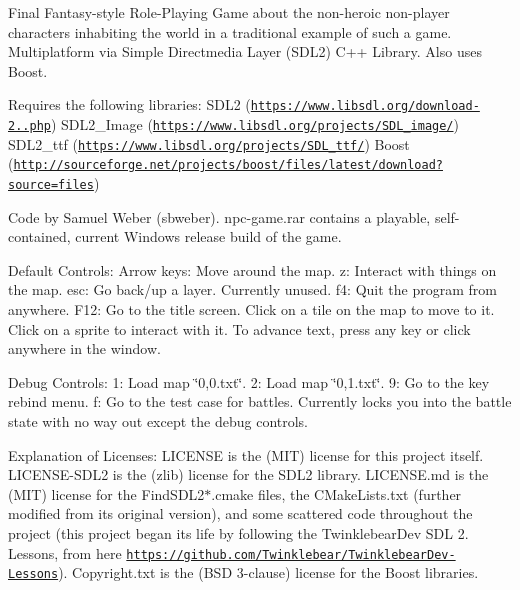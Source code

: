 Final Fantasy-\/style Role-\/\+Playing Game about the non-\/heroic non-\/player characters inhabiting the world in a traditional example of such a game. Multiplatform via Simple Directmedia Layer (S\+D\+L2) C++ Library. Also uses Boost.

Requires the following libraries\+: S\+D\+L2 (\href{https://www.libsdl.org/download-2.0.php}{\tt https\+://www.\+libsdl.\+org/download-\/2..\+php}) S\+D\+L2\+\_\+\+Image (\href{https://www.libsdl.org/projects/SDL_image/}{\tt https\+://www.\+libsdl.\+org/projects/\+S\+D\+L\+\_\+image/}) S\+D\+L2\+\_\+ttf (\href{https://www.libsdl.org/projects/SDL_ttf/}{\tt https\+://www.\+libsdl.\+org/projects/\+S\+D\+L\+\_\+ttf/}) Boost (\href{http://sourceforge.net/projects/boost/files/latest/download?source=files}{\tt http\+://sourceforge.\+net/projects/boost/files/latest/download?source=files})

Code by Samuel Weber (sbweber). npc-\/game.\+rar contains a playable, self-\/contained, current Windows release build of the game.

Default Controls\+: Arrow keys\+: Move around the map. z\+: Interact with things on the map. esc\+: Go back/up a layer. Currently unused. f4\+: Quit the program from anywhere. F12\+: Go to the title screen. Click on a tile on the map to move to it. Click on a sprite to interact with it. To advance text, press any key or click anywhere in the window.

Debug Controls\+: 1\+: Load map \char`\"{}0,0.\+txt\char`\"{}. 2\+: Load map \char`\"{}0,1.\+txt\char`\"{}. 9\+: Go to the key rebind menu. f\+: Go to the test case for battles. Currently locks you into the battle state with no way out except the debug controls.

Explanation of Licenses\+: L\+I\+C\+E\+N\+SE is the (M\+IT) license for this project itself. L\+I\+C\+E\+N\+S\+E-\/\+S\+D\+L2 is the (zlib) license for the S\+D\+L2 library. L\+I\+C\+E\+N\+S\+E.\+md is the (M\+IT) license for the Find\+S\+D\+L2$\ast$.cmake files, the C\+Make\+Lists.\+txt (further modified from its original version), and some scattered code throughout the project (this project began its life by following the Twinklebear\+Dev S\+DL 2. Lessons, from here \href{https://github.com/Twinklebear/TwinklebearDev-Lessons}{\tt https\+://github.\+com/\+Twinklebear/\+Twinklebear\+Dev-\/\+Lessons}). Copyright.\+txt is the (B\+SD 3-\/clause) license for the Boost libraries. 